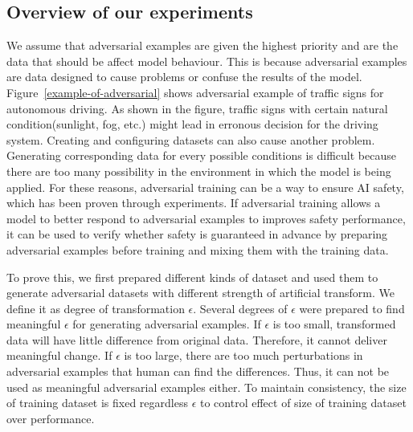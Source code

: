 \documentclass[symmetry,article,submit,moreauthors,pdftex]{Definitions/mdpi}
\begin{document}
\subsection{Overview of our experiments}

We assume that adversarial examples are given the highest priority and are the data that should be affect model behaviour.
This is because adversarial examples are data designed to cause problems or confuse the results of the model.
 Figure~\ref{example-of-adversarial} shows adversarial example of traffic signs for autonomous driving. As shown in the figure, traffic signs with certain natural condition(sunlight, fog, etc.) might lead in erronous decision for the driving system. 
Creating and configuring datasets can also cause another problem. Generating corresponding data for every possible conditions is difficult because there are too many possibility in the environment in which the model is being applied.
For these reasons, adversarial training can be a way to ensure AI safety, which has been proven through experiments.
If adversarial training allows a model to better respond to adversarial examples to improves safety performance, it can be used to verify whether safety is guaranteed in advance by preparing adversarial examples before training and mixing them with the training data.

To prove this, we first prepared different kinds of dataset and used them to generate adversarial datasets with different strength of artificial transform. We define it as degree of transformation \begin{math}\epsilon\end{math}.
Several degrees of \begin{math}\epsilon\end{math} were prepared to find meaningful \begin{math}\epsilon\end{math} for generating adversarial examples.
If \begin{math}\epsilon\end{math} is too small, transformed data will have little difference from original data. Therefore, it cannot deliver meaningful change.
If \begin{math}\epsilon\end{math} is too large, there are too much perturbations in adversarial examples that human can find the differences. Thus, it can not be used as meaningful adversarial examples either.
To maintain consistency, the size of training dataset is fixed regardless \begin{math}\epsilon\end{math} to control effect of size of training dataset over performance.
\end{document}

